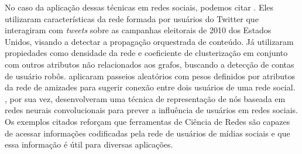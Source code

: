 No caso da aplicação dessas técnicas em redes sociais, podemos citar
\citet{ratkiewicz11}.
Eles utilizaram características da rede formada por usuários do Twitter que
interagiram com \textit{tweets} sobre as campanhas eleitorais de 2010 dos
Estados Unidos, visando a detectar a propagação orquestrada de conteúdo.
Já \citet{varol18} utilizaram propiedades como densidade da rede e coeficiente de
clusterização em conjunto com outros atributos não relacionados aos grafos,
buscando a detecção de contas de usuário robôs.
\citet{backstrom11} aplicaram passeios aleatórios com pesos definidos por
atributos da rede de amizades para sugerir conexão entre dois usuários de uma
rede social.
\citet{qiu18}, por sua vez, desenvolveram uma técnica de representação de nós
baseada em redes neurais convolucionais para prever a influência de usuários em
redes sociais.
Os exemplos citados reforçam que ferramentas de Ciência de Redes são capazes de
acessar informações codificadas pela rede de usuários de mídias sociais e que essa
informação é útil para diversas aplicações.




